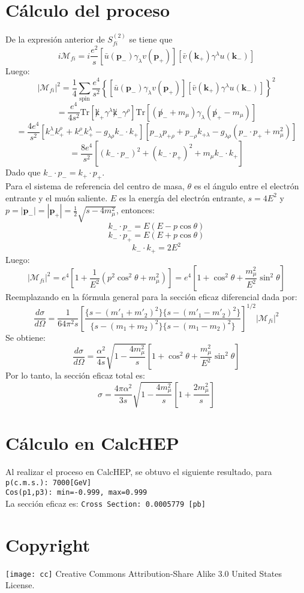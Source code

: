 \section{Cálculo del proceso}
De la expresión anterior de $S^{(2)}_{fi}$ se tiene que
\begin{equation}
 i\mathcal{M}_{fi}= i\frac{e^2}{s}\left[\bar{u}(\mathbf{p_-})\gamma_{\lambda} v(\mathbf{p_+})\right] \left[\bar{v}(\mathbf{k_+})\gamma^{\lambda}u(\mathbf{k_-})\right]
\end{equation}
Luego:
\[
 |\mathcal{M}_{fi}|^2=\frac{1}{4}\sum_{\mbox{spin}}\frac{e^4}{s^2}\left\{ \left[\bar{u}(\mathbf{p_-})\gamma_{\lambda} v(\mathbf{p_+})\right] \left[\bar{v}(\mathbf{k_+})\gamma^{\lambda}u(\mathbf{k_-})\right] \right\}^2
\]
\[
 =\frac{e^4}{4s^2}\mbox{Tr}\left[\not k_{+}\gamma^{\lambda} \not k_-\gamma^{\rho} \right]\mbox{Tr}\left[(\not p_- +m_{\mu})\gamma_{\lambda}(\not p_+-m_{ \mu}) \right]
\]
\[
 =\frac{4e^4}{s^2}\left[k_{-}^{\lambda}k_+^{\rho}+ k_{-}^{\rho}k_+^{\lambda}-g_{\lambda \rho}k_-\cdot k_+ \right]\left[ p_{-\lambda}p_{+\rho}+ p_{-\rho}k_{+\lambda}-g_{\lambda \rho}(p_-\cdot p_+ +m_{\mu}^{2})\right]
\]
\[
 =\frac{8e^4}{s^2}\left[(k_-\cdot p_-)^2+(k_-\cdot p_+)^2+m_{\mu}k_-\cdot k_+ \right]
\]
Dado que $k_-\cdot p_-=k_+\cdot p_+$.\\
Para el sistema de referencia del centro de masa, $\theta$ es el ángulo entre el electrón entrante y el muón saliente. $E$ es la energía del 
electrón entrante, $s=4E^2$ y $p=|\mathbf{p_-}|=|\mathbf{p_+}|=\frac{1}{2}\sqrt{s-4m_{\mu}^{2}}$, entonces:
\[
 k_-\cdot p_-=E(E-p \cos \theta)
\]
\[
 k_-\cdot p_+=E(E+p \cos \theta)
\]
\[
 k_-\cdot k_+=2E^2
\]
Luego:
\[
 |\mathcal{M}_{fi}|^2=e^4\left[1+ \frac{1}{E^2}\left(p^2 \cos^2 \theta+m_{\mu}^{2} \right) \right]=e^4\left[1+ \cos^2\theta+\frac{m_{\mu}^{2}}{E^2}\sin^2\theta \right]
\]
Reemplazando en la fórmula general para la sección eficaz diferencial dada por:
\[
 \frac{d\sigma}{d\Omega}=\frac{1}{64 \pi^2 s}\left[\frac{\{s-(m'_1+m'_2)^2\}\{s-(m'_1-m'_2)^2 \}}{\{s-(m_1+m_2)^2\}\{s-(m_1-m_2)^2 \}} \right]^{1/2}|\mathcal{M}_{fi}|^2
\]
Se obtiene:
\[
 \frac{d\sigma}{d\Omega}=\frac{\alpha^2}{4s}\sqrt{1-\frac{4m^{2}_{\mu}}{s}}\left[1+ \cos^2\theta+\frac{m_{\mu}^{2}}{E^2}\sin^2\theta \right]
\]
Por lo tanto, la sección eficaz total es:
\[
 \sigma=\frac{4\pi\alpha^2}{3s}\sqrt{1-\frac{4m^{2}_{\mu}}{s}}\left[1+ \frac{2m_{\mu}^{2}}{s} \right]
\]


\section{Cálculo en CalcHEP}
Al realizar el proceso en CalcHEP, se obtuvo el siguiente resultado, para\\
\texttt{p(c.m.s.): 7000[GeV]}\\
\texttt{Cos(p1,p3): min=-0.999, max=0.999}\\
La sección eficaz es:
\texttt{Cross Section: 0.0005779 [pb]}



\section{Copyright}
\texttt{[image: cc]} Creative Commons Attribution-Share Alike 3.0 United States License.





